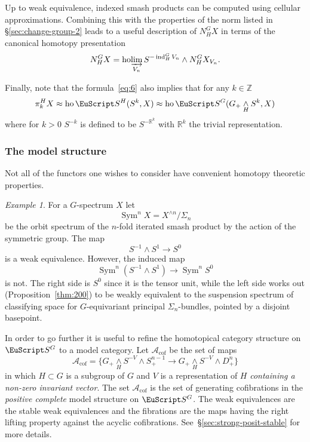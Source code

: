 \documentclass{amsart}
\theoremstyle{definition}
\theoremstyle{remark}
\newtheorem{eg}[equation]{Example}
\newcommand{\Z}{{\mathbb Z}}
\newcommand{\R}{{\mathbb R}}
\DeclareMathOperator{\sym}{Sym}
\newcommand{\spectra}{\EuScript S}
\DeclareMathOperator{\ho}{ho}
\newcommand{\smashove}[1]{\underset{#1}{\wedge}}
\newcommand{\norm}{N}
\DeclareMathOperator{\ind}{ind}
\newcommand{\ugspectra}[1]{\spectra^{#1}}
\newcommand{\hocolim}{\ho\!\varinjlim}
\newcommand{\gencof}{\mathcal A_{\text{cof}}}
\begin{document}
Up to weak equivalence, indexed smash products can be computed using
cellular approximations.  Combining this with the properties of the
norm listed in \S\ref{sec:change-group-2} leads to a useful
description of $\norm_{H}^{G}X$ in terms of the canonical homotopy
presentation
\[
\norm_{H}^{G}X = \hocolim_{V_{n}} S^{-\ind_{H}^{G}V_{n}}\wedge
\norm_{H}^{G}X_{V_{n}}.
\]

Finally, note that the formula~\eqref{eq:6} also implies that for any
$k\in \Z$
\[
\pi_{k}^{H}X \approx \ho \ugspectra{H}(S^{k},X) \approx \ho\ugspectra{G}(G_{+}\underset{H}{\wedge}S^{k},X)
\]
where for $k>0$ $S^{-k}$ is defined to be $S^{-\R^{k}}$ with $\R^{k}$
the trivial representation.

\subsubsection{The model structure}
\label{sec:model-structure}

Not all of the functors one wishes to consider have convenient
homotopy theoretic properties.

\begin{eg}
\label{eg:14}
For a $G$-spectrum $X$ let
\[
\sym^{n}X = X^{\wedge n}/\Sigma_{n}
\]
be the orbit spectrum of the $n$-fold iterated smash product by the action of
the symmetric group.  The map 
\[
S^{-1}\wedge S^{1}\to S^{0}
\]
is a weak equivalence.   However, the induced map 
\[
\sym^{n}(S^{-1}\wedge S^{1})\to \sym^{n}S^{0}
\]
is not.  The right side is $S^{0}$ since it is the tensor unit, while
the left side works out (Proposition~\ref{thm:200}) to be weakly
equivalent to the suspension spectrum of classifying space for
$G$-equivariant principal $\Sigma_{n}$-bundles, pointed by a disjoint
basepoint.
\end{eg}

In order to go further it is useful to refine the homotopical category
structure on $\ugspectra{G}$ to a model category.  Let $\gencof$ be
the set of maps
\begin{equation}
\gencof = \{G_{+}\smashove{H} S^{-V}\wedge S^{n-1}_{+}\to
G_{+}\smashove{H} S^{-V}\wedge D^{n}_{+} \}
\end{equation}
in which $H\subset G$ is a subgroup of $G$ and $V$ is a representation
of $H$ {\em containing a non-zero invariant vector}.     The set
$\gencof$ is the set of generating cofibrations in the {\em
positive complete} model structure on $\ugspectra{G}$.     The weak
equivalences are the stable weak equivalences and the fibrations are
the maps having the right lifting property against the acyclic
cofibrations.   See~\S\ref{sec:strong-posit-stable} for more details.
\end{document}

